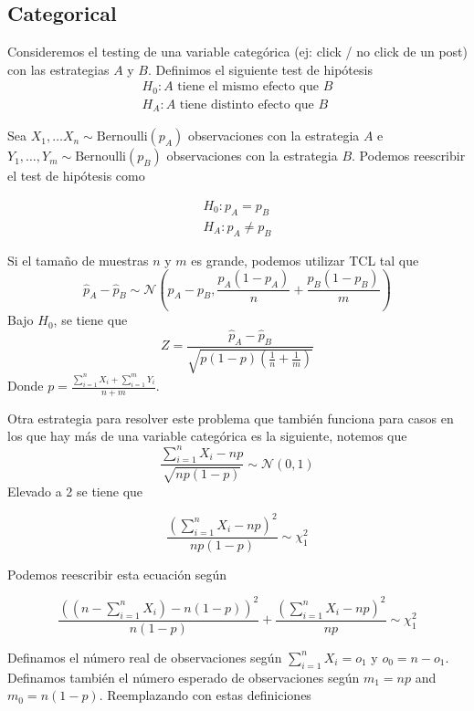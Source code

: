 \subsection{Categorical}

Consideremos el testing de una variable categórica (ej: click / no click de un post) con las estrategias $A$ y $B$. Definimos el siguiente test de hipótesis 
\begin{equation*}
\begin{aligned}
    H_0: A \text{ tiene el mismo efecto que } B \\ 
    H_A: A \text{ tiene distinto efecto que } B
\end{aligned}
\end{equation*}

Sea $X_1 , \dots X_n \sim \text{Bernoulli}(p_A)$ observaciones con la estrategia $A$ e $Y_1, \dots, Y_m \sim \text{Bernoulli}(p_B)$ observaciones con la estrategia $B$. Podemos reescribir el test de hipótesis como 

\begin{equation*}
\begin{aligned}
    H_0: p_A = p_B \\ 
    H_A: p_A \neq p_B
\end{aligned}
\end{equation*}

Si el tamaño de muestras $n$ y $m$ es grande, podemos utilizar TCL tal que 
$$
\hat{p}_A - \hat{p}_B \sim \mathcal{N} \left ( p_A - p_B , \frac{p_A(1-p_A)}{n} + \frac{p_B(1-p_B)}{m} \right )
$$
Bajo $H_0$, se tiene que 
$$
Z = \frac{\hat{p}_A - \hat{p}_B}{\sqrt{p(1-p)\left ( \frac{1}{n} + \frac{1}{m} \right )}}
$$
Donde $p = \frac{\sum_{i=1}^n X_i + \sum_{i=1}^m Y_i}{n + m}$.

Otra estrategia para resolver este problema que también funciona para casos en los que hay más de una variable categórica es la siguiente, notemos que 
$$
\frac{\sum_{i=1}^{n}X_i - np}{\sqrt{np(1-p)}} \sim \mathcal{N}(0, 1)
$$
Elevado a 2 se tiene que 

$$ \frac{(\sum_{i=1}^{n}X_i - np)^2}{np(1-p)} \sim \chi^2_{1}$$

Podemos reescribir esta ecuación según 

$$ \frac{((n-\sum_{i=1}^n X_i) - n(1-p))^2}{n(1-p)} + \frac{(\sum_{i=1}^n X_i - np)^2}{np} \sim \chi^2_{1}$$

Definamos el número real de observaciones según $\sum_{i=1}^n X_i = o_1$ y $o_0 = n - o_1$. Definamos también el número esperado de observaciones según $m_1 = np$ and $m_0 = n(1-p)$. Reemplazando con estas definiciones

